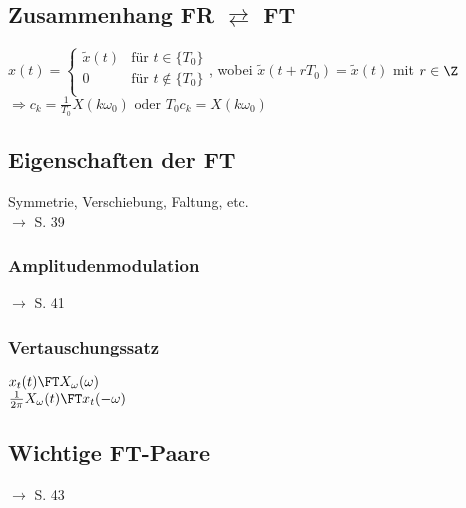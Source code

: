 \documentclass[german]{latex4ei/latex4ei_sheet}
\renewcommand{\diff}{\mathop{}\!\mathrm{\vphantom( d}}
\begin{document}
\begin{minipage}{\columnwidth}
\begin{sectionbox}
		\subsection*{Zusammenhang FR $\rightleftarrows$ FT}
		$x(t) = \begin{cases}
			\tilde{x}(t) & \text{für } t \in \{T_0\}\\
			0 & \text{für } t \notin \{T_0\}\\
		\end{cases}$, wobei $\tilde{x}(t + r T_0) = \tilde{x}(t)$ mit $r \in \Z$\\
		$\Rightarrow \boxed{
			c_k = \frac{1}{T_0} X(k \omega_0) \text{ oder } T_0 c_k = X(k \omega_0)	
		}$
		
		\subsection*{Eigenschaften der FT}
		Symmetrie, Verschiebung, Faltung, etc.\\
		$\rightarrow$ S. 39
		
			\subsubsection*{Amplitudenmodulation}
			$\rightarrow$ S. 41
			
			\subsubsection*{Vertauschungssatz}
			$x_t(t) \FT X_{\omega}(\omega)$\\
			$\frac{1}{2 \pi} X_{\omega}(t) \FT x_t(-\omega)$
			
		\subsection*{Wichtige FT-Paare}
		$\rightarrow$ S. 43

%	
%	
%	

\end{sectionbox}
\end{minipage}
\end{document}
